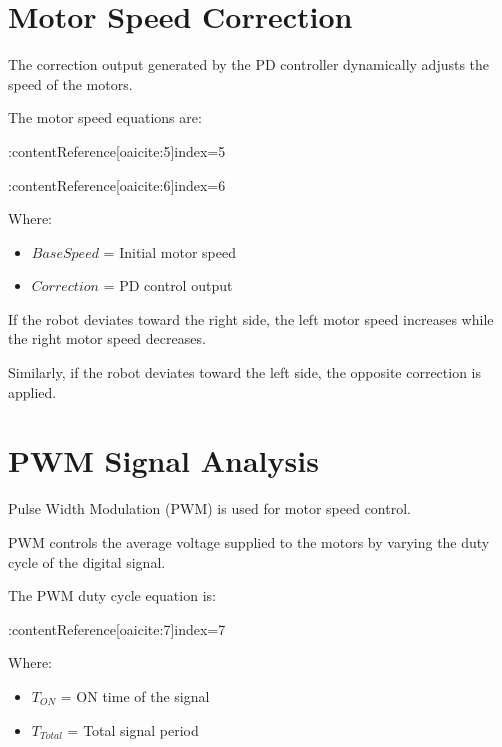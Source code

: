 \documentclass[12pt,a4paper,oneside]{report}
\begin{document}

\section{Motor Speed Correction}

The correction output generated by the PD controller dynamically adjusts the speed of the motors.

The motor speed equations are:

:contentReference[oaicite:5]{index=5}

:contentReference[oaicite:6]{index=6}

Where:

\begin{itemize}

\item \(BaseSpeed\) = Initial motor speed

\item \(Correction\) = PD control output

\end{itemize}

If the robot deviates toward the right side, the left motor speed increases while the right motor speed decreases.

Similarly, if the robot deviates toward the left side, the opposite correction is applied.


\section{PWM Signal Analysis}

Pulse Width Modulation (PWM) is used for motor speed control.

PWM controls the average voltage supplied to the motors by varying the duty cycle of the digital signal.

The PWM duty cycle equation is:

:contentReference[oaicite:7]{index=7}

Where:

\begin{itemize}

\item \(T_{ON}\) = ON time of the signal

\item \(T_{Total}\) = Total signal period

\end{itemize}
\end{document}
